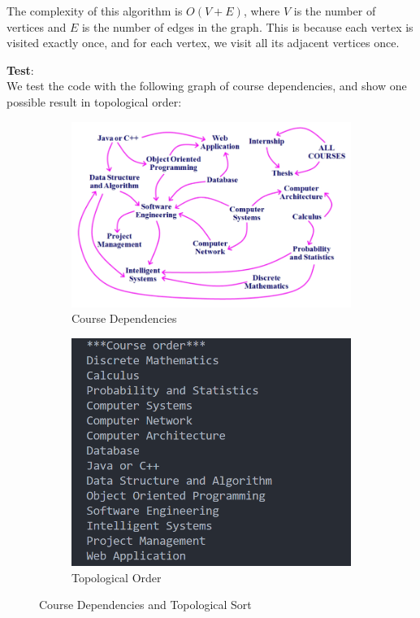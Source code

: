 \documentclass[UTF8]{ctexart}
\begin{document}
The complexity of this algorithm is \(O(V + E)\), where \(V\) is the number of vertices and \(E\) is the number of edges in the graph. 
This is because each vertex is visited exactly once, and for each vertex, we visit all its adjacent vertices once.

\textbf{\large Test}:\\
We test the code with the following graph of course dependencies, and show one possible result in topological order:

\begin{figure}[htbp]
    \centering
    \begin{subfigure}{0.5\textwidth}
        \centering
        \includegraphics[width=0.8\linewidth]{course.png}
        \caption{Course Dependencies}
    \end{subfigure}%
    \hfill
    \begin{subfigure}{0.5\textwidth}
        \centering
        \includegraphics[width=0.7\linewidth]{courseorder.png}
        \caption{Topological Order}
    \end{subfigure}%
    \caption{Course Dependencies and Topological Sort}
\end{figure}
\end{document}
